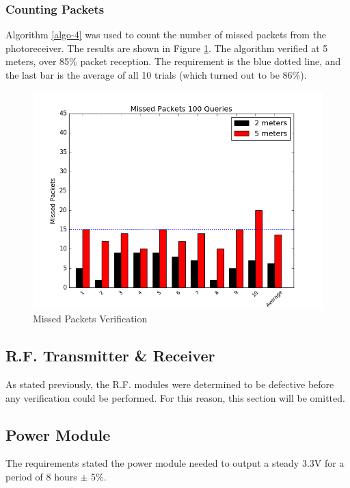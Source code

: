 \documentclass[letterpaper,10pt]{article}
\begin{document}
\begin{spacing}{1.15}
\subsubsection {Counting Packets}
Algorithm \ref{algo-4} was used to count the number of missed packets from the photoreceiver.
The results are shown in Figure \ref{fig:transmitted-received}. The algorithm verified at 5 meters, over 85\% packet reception. The requirement is the blue dotted line, and the last bar is the average of all 10 trials (which turned out to be 86\%).

\begin{figure} [H]
	\centering
	\includegraphics[scale=0.45]{transmitted_received.png}
	\caption{Missed Packets Verification\label{fig:transmitted-received}}
\end{figure}

\subsection{R.F. Transmitter \& Receiver}
As stated previously, the R.F. modules were determined to be defective before any verification could be performed. For this reason, this section will be omitted. 

\subsection{Power Module}
The requirements stated the power module needed to output a steady 3.3V for a period of 8 hours $\pm$ 5\%.


\end{spacing}
\end{document}
